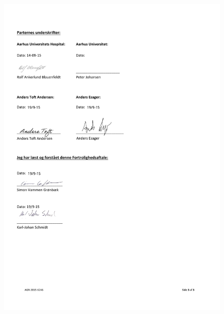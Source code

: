 \begin{figure}[H]
	\includegraphics[width = 1\textwidth]{billeder/FortrolighedsaftaleSide3.pdf}
\end{figure}

